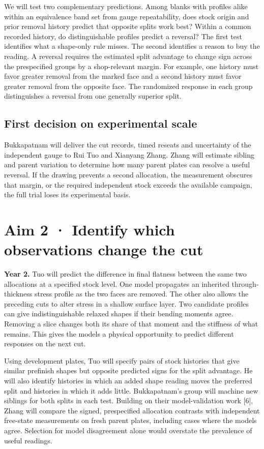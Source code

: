 \documentclass[11pt,letterpaper]{article}
\begin{document}
We will test two complementary predictions. Among blanks with profiles alike within an equivalence band set from gauge repeatability, does stock origin and prior removal history predict that opposite splits work best? Within a common recorded history, do distinguishable profiles predict a reversal? The first test identifies what a shape-only rule misses. The second identifies a reason to buy the reading. A reversal requires the estimated split advantage to change sign across the prespecified groups by a shop-relevant margin. For example, one history must favor greater removal from the marked face and a second history must favor greater removal from the opposite face. The randomized response in each group distinguishes a reversal from one generally superior split.

\subsection*{First decision on experimental scale}

Bukkapatnam will deliver the cut records, timed reseats and uncertainty of the independent gauge to Rui Tuo and Xianyang Zhang. Zhang will estimate sibling and parent variation to determine how many parent plates can resolve a useful reversal. If the drawing prevents a second allocation, the measurement obscures that margin, or the required independent stock exceeds the available campaign, the full trial loses its experimental basis.

\newpage

\section*{Aim 2 · Identify which observations change the cut}

\textbf{Year 2.} Tuo will predict the difference in final flatness between the same two allocations at a specified stock level. One model propagates an inherited through-thickness stress profile as the two faces are removed. The other also allows the preceding cuts to alter stress in a shallow surface layer. Two candidate profiles can give indistinguishable relaxed shapes if their bending moments agree. Removing a slice changes both its share of that moment and the stiffness of what remains. This gives the models a physical opportunity to predict different responses on the next cut.

Using development plates, Tuo will specify pairs of stock histories that give similar prefinish shapes but opposite predicted signs for the split advantage. He will also identify histories in which an added shape reading moves the preferred split and histories in which it adds little. Bukkapatnam's group will machine new siblings for both splits in each test. Building on their model-validation work [6], Zhang will compare the signed, prespecified allocation contrasts with independent free-state measurements on fresh parent plates, including cases where the models agree. Selection for model disagreement alone would overstate the prevalence of useful readings.
\end{document}
